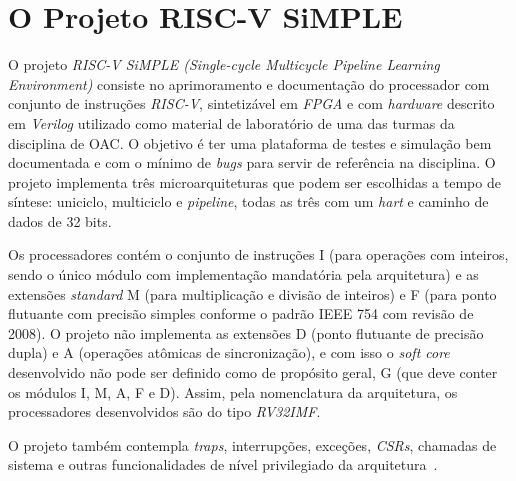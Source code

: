\section{O Projeto RISC-V SiMPLE}
{
    O projeto \textit{RISC-V SiMPLE (Single-cycle Multicycle Pipeline Learning
    Environment)} consiste no aprimoramento e documentação do processador com
    conjunto de instruções \textit{RISC-V}, sintetizável em \textit{FPGA} e com
    \textit{hardware} descrito em \textit{Verilog} utilizado como material de
    laboratório de uma das turmas da disciplina de OAC. O objetivo é ter uma
    plataforma de testes e simulação bem documentada e com o mínimo de
    \textit{bugs} para servir de referência na disciplina. O projeto implementa
    três microarquiteturas que podem ser escolhidas a tempo de síntese:
    uniciclo, multiciclo e \textit{pipeline}, todas as três com um \textit{hart}
    e caminho de dados de 32 bits.

    Os processadores contém o conjunto de instruções I (para operações com
    inteiros, sendo o único módulo com implementação mandatória pela
    arquitetura) e as extensões \textit{standard} M (para multiplicação e
    divisão de inteiros) e F (para ponto flutuante com precisão simples conforme
    o padrão IEEE 754 com revisão de 2008). O projeto não implementa as
    extensões D (ponto flutuante de precisão dupla) e A (operações atômicas de
    sincronização), e com isso o \textit{soft core} desenvolvido não pode ser
    definido como de propósito geral, G (que deve conter os módulos I, M, A, F
    e D). Assim, pela nomenclatura da arquitetura, os processadores
    desenvolvidos são do tipo \textit{RV32IMF}.

    O projeto também contempla \textit{traps}, interrupções, exceções,
    \textit{CSRs}, chamadas de sistema e outras funcionalidades de nível
    privilegiado da arquitetura~\cite{riscv_spec2}.
}

